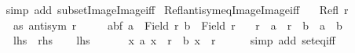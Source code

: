 \begin{isabellebody}
%
\isadelimproof
\ \ %
\endisadelimproof
%
\isatagproof
{}\isamarkupfalse%
\ {\isacharparenleft}{\kern0pt}simp\ add{\isacharcolon}{\kern0pt}\ subset{\isacharunderscore}{\kern0pt}Image{\isacharunderscore}{\kern0pt}Image{\isacharunderscore}{\kern0pt}iff{\isacharparenright}{\kern0pt}%
\endisatagproof
{\isafoldproof}%
%
\isadelimproof
\isanewline
%
\endisadelimproof
\isanewline
{}\isamarkupfalse%
\ Refl{\isacharunderscore}{\kern0pt}antisym{\isacharunderscore}{\kern0pt}eq{\isacharunderscore}{\kern0pt}Image{}{\isacharunderscore}{\kern0pt}Image{}{\isacharunderscore}{\kern0pt}iff{\isacharcolon}{\kern0pt}\isanewline
\ \ \ {\isachardoublequoteopen}Refl\ r{\isachardoublequoteclose}\isanewline
\ \ \ \ \ as{\isacharcolon}{\kern0pt}\ {\isachardoublequoteopen}antisym\ r{\isachardoublequoteclose}\isanewline
\ \ \ \ \ abf{\isacharcolon}{\kern0pt}\ {\isachardoublequoteopen}a\ {\isasymin}\ Field\ r{\isachardoublequoteclose}\ {\isachardoublequoteopen}b\ {\isasymin}\ Field\ r{\isachardoublequoteclose}\isanewline
\ \ \ {\isachardoublequoteopen}r\ {\isacharbackquote}{\kern0pt}{\isacharbackquote}{\kern0pt}\ {\isacharbraceleft}{\kern0pt}a{\isacharbraceright}{\kern0pt}\ {\isacharequal}{\kern0pt}\ r\ {\isacharbackquote}{\kern0pt}{\isacharbackquote}{\kern0pt}\ {\isacharbraceleft}{\kern0pt}b{\isacharbraceright}{\kern0pt}\ {\isasymlongleftrightarrow}\ a\ {\isacharequal}{\kern0pt}\ b{\isachardoublequoteclose}\isanewline
\ \ \ \ {\isacharparenleft}{\kern0pt}\ {\isachardoublequoteopen}{\isacharquery}{\kern0pt}lhs\ {\isasymlongleftrightarrow}\ {\isacharquery}{\kern0pt}rhs{\isachardoublequoteclose}{\isacharparenright}{\kern0pt}\isanewline
%
\isadelimproof
%
\endisadelimproof
%
\isatagproof
{}\isamarkupfalse%
\isanewline
\ \ \isamarkupfalse%
\ {\isacharquery}{\kern0pt}lhs\isanewline
\ \ \isamarkupfalse%
\ \isamarkupfalse%
\ {\isacharasterisk}{\kern0pt}{\isacharcolon}{\kern0pt}\ {\isachardoublequoteopen}{\isasymAnd}x{\isachardot}{\kern0pt}\ {\isacharparenleft}{\kern0pt}a{\isacharcomma}{\kern0pt}\ x{\isacharparenright}{\kern0pt}\ {\isasymin}\ r\ {\isasymlongleftrightarrow}\ {\isacharparenleft}{\kern0pt}b{\isacharcomma}{\kern0pt}\ x{\isacharparenright}{\kern0pt}\ {\isasymin}\ r{\isachardoublequoteclose}\isanewline
\ \ \ \ \isamarkupfalse%
\ {\isacharparenleft}{\kern0pt}simp\ add{\isacharcolon}{\kern0pt}\ set{\isacharunderscore}{\kern0pt}eq{\isacharunderscore}{\kern0pt}iff{\isacharparenright}{\kern0pt}\isanewline

\end{isabellebody}
